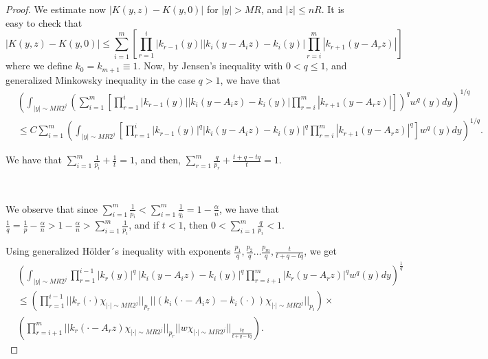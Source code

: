 \documentclass[a4paper,12pt,reqno]{amsart}
\numberwithin{equation}{section}
\begin{document}
\begin{proof}
		
		We estimate now $\left| K(y,z)-K(y,0)\right| $ for $|y|>MR$,  and $|z|\leq  n R$.  It is easy to check that
		{\small		\begin{equation}\label{formki}
				\left| K(y,z)-K(y,0)\right| \leq\sum_{i=1}^m \left[
				\prod_{r=1}^i|k_{r-1}(y)||k_i(y-A_iz)-k_i(y)|\prod_{r=i}^m |k_{r+1}(y-A_rz)|\right]
			\end{equation}
		}		
		where we define $k_{0}=k_{m+1}\equiv 1$. Now, by Jensen's inequality with $0 < q \leq 1$, and generalized Minkowsky inequality in the case $q>1$, we have that
		$$
		\begin{aligned}
			&\left(\int_{|y|\sim M R2^{j}} \left(\sum_{i=1}^m \left[
			\prod_{r=1}^i|k_{r-1}(y)||k_i(y-A_iz)-k_i(y)|\prod_{r=i}^m |k_{r+1}(y-A_rz)|\right]\right)^q w^q(y) dy\right)^{1/q}\\
			& \leq C  \sum_{i=1}^m\left(\int_{|y|\sim M R2^{j}} \left[
			\prod_{r=1}^i|k_{r-1}(y)|^q|k_i(y-A_iz)-k_i(y)|^q\prod_{r=i}^m |k_{r+1}(y-A_rz)|^q\right] w^q(y) dy\right)^{1/q}.
		\end{aligned}
		$$
		
		
		
		We have that $\sum_{i=1}^{m}\frac{1}{p_i}+\frac{1}{t}=1$, and then, $\sum_{r=1}^{m}\frac{q}{p_r} + \frac{t+q-tq}{t}=1$. 
		
		\
		
		We observe that since $\sum_{i=1}^{m}\frac{1}{p_i} < \sum_{i=1}^{m} \frac{1}{q_i} = 1 - \frac{\alpha}{n}$, we have that $\frac{1}{q}=\frac{1}{p}-\frac{\alpha}{n} > 1 -\frac{\alpha}{n} > \sum_{i=1}^{m}\frac{1}{p_i}$, and if $t<1$, then $0 < \sum_{i=1}^{m}\frac{q}{p_i}<1$.
		
		Using generalized H\"{o}lder´s inequality with exponents $\frac{p_1}{q},\frac{p_2}{q}\dots \frac{p_m}{q},\frac {t}{t+q-tq}$, we get
		$$		
		\begin{aligned}
			& \left(\int_{|y|\sim M R2^{j}}\prod_{r=1}^{i-1}|k_r(y)|^q \ |k_i(y-A_iz)-k_i(y)|^q\prod_{r=i+1}^m |k_{r}(y-A_rz)|^q w^q(y)dy\right)^{\frac 1q} \\
			& \leq \left(\prod_{r=1}^{i-1}|| k_r(\cdot)\chi_{|\cdot|\sim MR2^{j}}||_{p_r}||(k_i(\cdot-A_iz )-k_i(\cdot))\chi_{|\cdot|\sim M R2^{j}}||_{p_i}\right) \times \\
			&\left(\prod_{r=i+1}^m||k_{r}(\cdot-A_r z)\chi_{|\cdot|\sim M R2^{j}}||_ {p_r}
			|| w   \chi _{|\cdot|\sim M R2^{j}}||_{\frac {tq}{t+q-tq}}\right).
		\end{aligned}
		$$
		

\end{proof}
\end{document}
